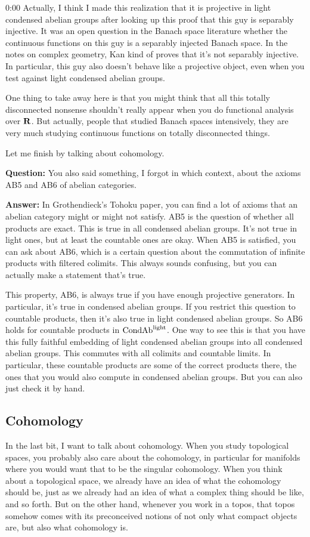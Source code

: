 \begin{unfinished}{0:00}
Actually, I think I made this realization that it is projective in light condensed abelian groups after looking up this proof that this guy is separably injective. It was an open question in the Banach space literature whether the continuous functions on this guy is a separably injected Banach space. In the notes on complex geometry, Kan kind of proves that it's not separably injective. 
In particular, this guy also doesn't behave like a projective object, even when you test against light condensed abelian groups.

One thing to take away here is that you might think that all this totally disconnected nonsense shouldn't really appear when you do functional analysis over $\mathbf R$. But actually, people that studied Banach spaces intensively, they are very much studying continuous functions on totally disconnected things.

Let me finish by talking about cohomology. 

\textbf{Question:} You also said something, I forgot in which context, about the axioms AB5 and AB6 of abelian categories.

\textbf{Answer:} In Grothendieck's Tohoku paper, you can find a lot of axioms that an abelian category might or might not satisfy. AB5 is the question of whether all products are exact. This is true in all condensed abelian groups. It's not true in light ones, but at least the countable ones are okay. When AB5 is satisfied, you can ask about AB6, which is a certain question about the commutation of infinite products with filtered colimits. This always sounds confusing, but you can actually make a statement that's true.

This property, AB6, is always true if you have enough projective generators. In particular, it's true in condensed abelian groups. If you restrict this question to countable products, then it's also true in light condensed abelian groups. 
So AB6 holds for countable products in $\mathrm{Cond}\mathrm{Ab}^{\mathrm{light}}$. One way to see this is that you have this fully faithful embedding of light condensed abelian groups into all condensed abelian groups. This commutes with all colimits and countable limits. In particular, these countable products are some of the correct products there, the ones that you would also compute in condensed abelian groups. But you can also just check it by hand.

\subsection{Cohomology}
In the last bit, I want to talk about cohomology. When you study topological spaces, you probably also care about the cohomology, in particular for manifolds where you would want that to be the singular cohomology. When you think about a topological space, we already have an idea of what the cohomology should be, just as we already had an idea of what a complex thing should be like, and so forth. 
But on the other hand, whenever you work in a topos, that topos somehow comes with its preconceived notions of not only what compact objects are, but also what cohomology is.


\end{unfinished}
